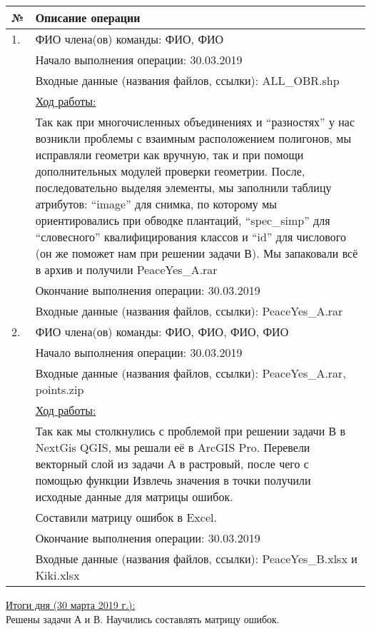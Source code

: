 \begin{center}
    \begin{longtable}{|l|p{14.5cm}|}
        \hline
        № & Описание операции \\
        \hline
        1. & ФИО члена(ов) команды: ФИО, ФИО \\
           & Начало выполнения операции: 30.03.2019 \\
           & Входные данные (названия файлов, ссылки): ALL\_OBR.shp \\
           & \underline{Ход работы:} \\
           & Так как при многочисленных объединениях и “разностях” у нас возникли проблемы с взаимным расположением полигонов, мы исправляли геометри как вручную, так и при помощи дополнительных модулей проверки геометрии. После, последовательно выделяя элементы, мы заполнили таблицу атрибутов: “image” для снимка, по которому мы ориентировались при обводке плантаций, “spec\_simp” для “словесного” квалифицирования классов и “id” для числового (он же поможет нам при решении задачи В). Мы запаковали всё в архив и получили PeaceYes\_A.rar \\
           & Окончание выполнения операции: 30.03.2019 \\
           & Входные данные (названия файлов, ссылки): PeaceYes\_A.rar \\
         \hline
         2. & ФИО члена(ов) команды: ФИО, ФИО, ФИО, ФИО \\
            & Начало выполнения операции: 30.03.2019 \\
            & Входные данные (названия файлов, ссылки): PeaceYes\_A.rar, points.zip \\
            & \underline{Ход работы:} \\
            & Так как мы столкнулись с проблемой при решении задачи В в NextGis QGIS, мы решали её в ArcGIS Pro. Перевели векторный слой из задачи А в растровый, после чего с помощью функции Извлечь значения в точки получили исходные данные для матрицы ошибок. \\
            & Составили матрицу ошибок в Excel. \\
            & Окончание выполнения операции: 30.03.2019 \\
            & Входные данные (названия файлов, ссылки): PeaceYes\_B.xlsx и Kiki.xlsx \\
         \hline
   \end{longtable}
\end{center}
\underline{Итоги дня (30 марта 2019 г.):}\\
Решены задачи А и В. Научились составлять матрицу ошибок.